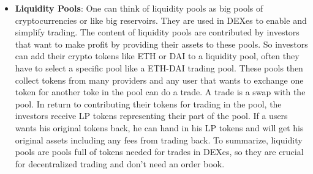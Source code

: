 \documentclass{article}
\begin{document}
\begin{itemize}
\item \textbf{Liquidity Pools}: One can think of liquidity pools as big pools of cryptocurrencies or like big reservoirs. They are used in DEXes to enable and simplify trading. The content of liquidity pools are contributed by investors that want to make profit by providing their assets to these pools. So investors can add their crypto tokens like ETH or DAI to a liquidity pool, often they have to select a specific pool like a ETH-DAI trading pool. These pools then collect tokens from many providers and any user that wants to exchange one token for another toke in the pool can do a trade. A trade is a swap with the pool. In return to contributing their tokens for trading in the pool, the investors receive LP tokens representing their part of the pool. If a users wants his original tokens back, he can hand in his LP tokens and will get his original assets including any fees from trading back. To summarize, liquidity pools are pools full of tokens needed for trades in DEXes, so they are crucial for decentralized trading and don't need an order book.


\end{itemize}
\end{document}
